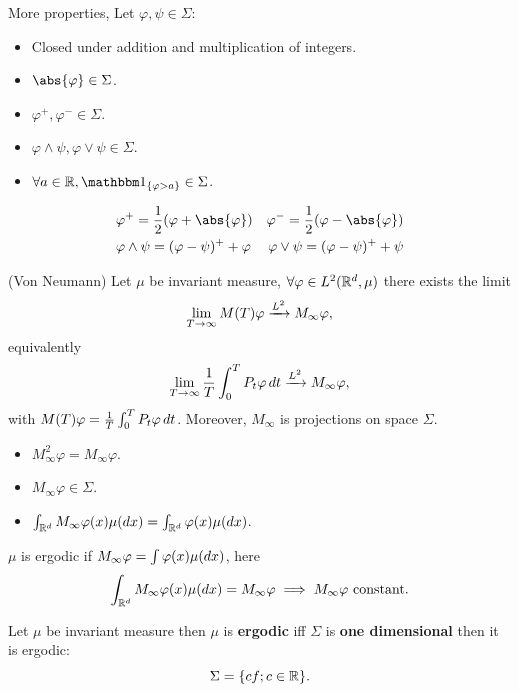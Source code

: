 More properties, Let $\varphi, \psi \in \Sigma$:
\begin{itemize}
    \item Closed under addition and multiplication of integers.
    \item $\abs{\varphi} \in \Sigma$.
    \item $\varphi^+, \varphi^- \in \Sigma$.
    \item $\varphi \wedge \psi, \varphi \vee \psi\in \Sigma$.
    \item $\forall a\in \R, \I{\{\varphi > a\}} \in \Sigma$.
\end{itemize}
\pf 
\begin{align*}
    &\varphi^+ = \frac{1}{2}(\varphi + \abs{\varphi}) &\varphi^- = \frac{1}{2}(\varphi - \abs{\varphi}) \\
    &\varphi \wedge \psi = (\varphi - \psi)^+ + \varphi &\varphi \vee \psi = (\varphi - \psi)^+ + \psi
\end{align*}
\begin{thm}{(Von Neumann)}
Let $\mu$ be invariant measure, $\forall \varphi \in L^{2}(\mathbb{R}^d,\mu)$ there exists the limit
\begin{equation*}
    \lim\limits_{T\rightarrow \infty} M(T)\varphi \xrightarrow{L^{2}} M_\infty \varphi,
\end{equation*} equivalently
\begin{equation*}
    \lim\limits_{T\rightarrow \infty} \frac{1}{T} \int_0^T P_t \varphi \mathop{}\!d t \xrightarrow{L^{2}} M_\infty \varphi,
\end{equation*}
with $M(T)\varphi = \frac{1}{T} \int_0^T P_t \varphi \mathop{}\!d t$. Moreover, $M_\infty$ is projections on space $\Sigma$.
\begin{itemize}
    \item $M_\infty^2 \varphi = M_\infty \varphi$.
    \item $M_\infty \varphi \in \Sigma$.
    \item $\int_{\mathbb{R}^d} M_\infty \varphi(x) \mu(\mathop{}\!d x) =  \int_{\mathbb{R}^d} \varphi(x) \mu(\mathop{}\!d x)$.
\end{itemize}
$\mu$ is ergodic if $M_\infty\varphi = \int \varphi(x) \mu(\mathop{}\!d x)$, here 
\begin{equation*}
    \int_{\mathbb{R}^d} M_\infty \varphi(x) \mu(\mathop{}\!d x) = M_\infty\varphi \implies M_\infty \varphi \text{ constant}.
\end{equation*}
\end{thm}

\begin{prop}
Let $\mu$ be invariant measure then $\mu$ is \textbf{ergodic} iff $\Sigma$ is \textbf{one dimensional} then it is ergodic:
\begin{equation*}
    \Sigma = \{ cf; c\in \mathbb{R} \}.
\end{equation*}
\end{prop}

